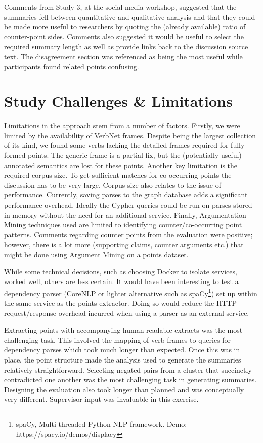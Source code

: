     Comments from Study 3, at the social media workshop, suggested that the summaries fell between quantitative and qualitative analysis and that they could be made more useful to researchers by quoting the (already available) ratio of counter-point sides. Comments also suggested it would be useful to select the required summary length as well as provide links back to the discussion source text. The disagreement section was referenced as being the most useful while participants found related points confusing.

  \section{Study Challenges \& Limitations}
    Limitations in the approach stem from a number of factors. Firstly, we were limited by the availability of VerbNet frames. Despite being the largest collection of its kind, we found some verbs lacking the detailed frames required for fully formed points. The generic frame is a partial fix, but the (potentially useful) annotated semantics are lost for these points.
    Another key limitation is the required corpus size. To get sufficient matches for co-occurring points the discussion has to be very large. Corpus size also relates to the issue of performance. Currently, saving parses to the graph database adds a significant performance overhead. Ideally the Cypher queries could be run on parses stored in memory without the need for an additional service.
    Finally, Argumentation Mining techniques used are limited to identifying counter/co-occurring point patterns. Comments regarding counter points from the evaluation were positive; however, there is a lot more (supporting claims, counter arguments etc.) that might be done using Argument Mining on a points dataset.

    While some technical decisions, such as choosing Docker to isolate services, worked well, others are less certain. It would have been interesting to test a dependency parser (CoreNLP or lighter alternative such as spaCy\footnote{spaCy, Multi-threaded Python NLP framework. Demo: https://spacy.io/demos/displacy}) set up within the same service as the points extractor. Doing so would reduce the HTTP request/response overhead incurred when using a parser as an external service.

    Extracting points with accompanying human-readable extracts was the most challenging task. This involved the mapping of verb frames to queries for dependency parses which took much longer than expected. Once this was in place, the point structure made the analysis used to generate the summaries relatively straightforward. Selecting negated pairs from a cluster that succinctly contradicted one another was the most challenging task in generating summaries. Designing the evaluation also took longer than planned and was conceptually very different. Supervisor input was invaluable in this exercise.

